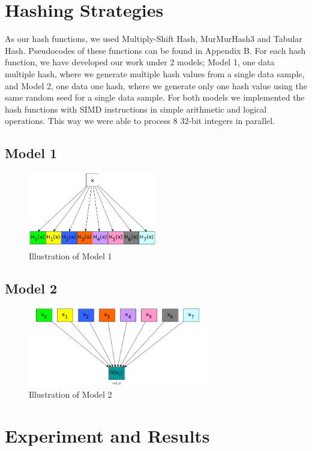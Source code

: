 \documentclass[11pt,oneside,a4paper]{article}
\begin{document}
\section{Hashing Strategies}
As our hash functions, we used Multiply-Shift Hash, MurMurHash3  and Tabular Hash. Pseudocodes of these functions can be found in Appendix B. For each hash function, we have developed our work under 2 models; Model 1, one data multiple hash, where we generate multiple hash values from a single data sample, and Model 2, one data one hash, where we generate only one hash value using the same random seed for a single data sample. For both models we implemented the hash functions with SIMD instructions in simple arithmetic and logical operations. This way we were able to process 8 32-bit integers in parallel.
\subsection{Model 1}
\begin{figure}[H]
\centering
\includegraphics[width=0.5\textwidth]{one_data_multi_hash.png} 
\caption{Illustration of Model 1}
\end{figure}
\subsection{Model 2}
\begin{figure}[H]
\centering
\includegraphics[width=0.7\textwidth]{multi_data_single_hash.png} 
\caption{Illustration of Model 2}
\end{figure}

\section{Experiment and Results}
\end{document}
